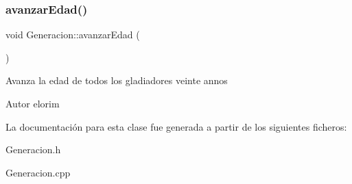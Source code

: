 \subsubsection{\texorpdfstring{avanzar\+Edad()}{avanzarEdad()}}
{\footnotesize\ttfamily void Generacion\+::avanzar\+Edad (\begin{DoxyParamCaption}{ }\end{DoxyParamCaption})}

Avanza la edad de todos los gladiadores veinte annos \begin{DoxyAuthor}{Autor}
elorim 
\end{DoxyAuthor}


La documentación para esta clase fue generada a partir de los siguientes ficheros\+:\begin{DoxyCompactItemize}
\item 
Generacion.\+h\item 
Generacion.\+cpp\end{DoxyCompactItemize}
